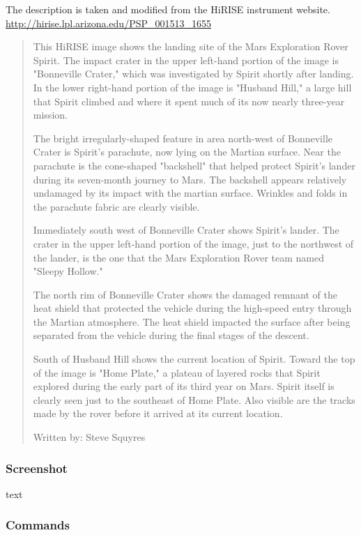 The description is taken and modified from the HiRISE instrument website.
\url{http://hirise.lpl.arizona.edu/PSP_001513_1655}

\begin{quotation}
This HiRISE image shows the landing site of the Mars Exploration Rover
Spirit. The impact crater in the upper left-hand portion of the image
is "Bonneville Crater," which was investigated by Spirit shortly after
landing. In the lower right-hand portion of the image is "Husband
Hill," a large hill that Spirit climbed and where it spent much of its
now nearly three-year mission.

The bright irregularly-shaped feature in area north-west of Bonneville
Crater is Spirit's parachute, now lying on the Martian surface. Near
the parachute is the cone-shaped "backshell" that helped protect
Spirit's lander during its seven-month journey to Mars. The backshell
appears relatively undamaged by its impact with the martian
surface. Wrinkles and folds in the parachute fabric are clearly
visible.

Immediately south west of Bonneville Crater shows Spirit's lander. The
crater in the upper left-hand portion of the image, just to the
northwest of the lander, is the one that the Mars Exploration Rover
team named "Sleepy Hollow."

The north rim of Bonneville Crater shows the damaged remnant of the
heat shield that protected the vehicle during the high-speed entry
through the Martian atmosphere. The heat shield impacted the surface
after being separated from the vehicle during the final stages of the
descent.

South of Husband Hill shows the current location of Spirit. Toward the
top of the image is "Home Plate," a plateau of layered rocks that
Spirit explored during the early part of its third year on
Mars. Spirit itself is clearly seen just to the southeast of Home
Plate. Also visible are the tracks made by the rover before it arrived
at its current location.

Written by: Steve Squyres
\end{quotation}

\subsubsection*{Screenshot}

text

\subsubsection*{Commands}

